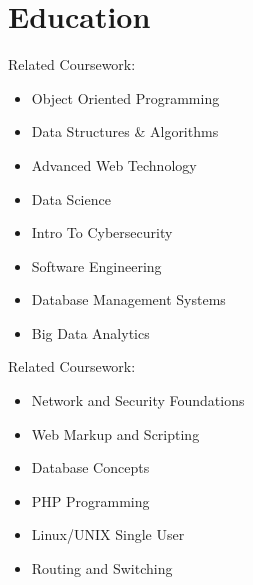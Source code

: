 \documentclass[11pt,a4paper,sans]{moderncv}        %
\begin{document}
\vspace*{-1.05mm}
\makecvtitle
\vspace*{-10mm}



\section{Education}



{}{Related Coursework:}
\vspace{-1.0em}\begin{small}
 \begin{multicols}{3}
    \begin{itemize}
\item Object Oriented Programming
\item Data Structures \& Algorithms
\item Advanced Web Technology
\item Data Science
\item Intro To Cybersecurity
\item Software Engineering
\item Database Management Systems
\item Big Data Analytics


    \end{itemize}
    \end{multicols}\end{small}
    


{}{Related Coursework:}
\vspace{-1.0em}\begin{small}
 \begin{multicols}{3}
    \begin{itemize}
\item Network and Security Foundations
\item Web Markup and Scripting
\item Database Concepts
\item PHP Programming
\item Linux/UNIX Single User
\item Routing and Switching

    \end{itemize}
    \end{multicols}
    \end{small}
    
\end{document}
